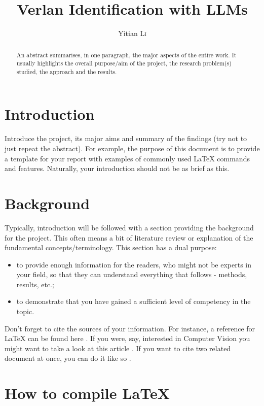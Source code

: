 \documentclass[12pt]{article}
\title{Verlan Identification with LLMs}
\author{Yitian \textsc{Li}}
\begin{document}
\maketitle

\begin{abstract}
An abstract summarises, in one paragraph, the major aspects of the entire work. It usually highlights the overall purpose/aim of the project, the research problem(s) studied, the approach and the results.
\end{abstract}

\section{Introduction}

Introduce the project, its major aims and summary of the findings (try not to just repeat the abstract). For example, the purpose of this document is to provide a template for your report with examples of commonly used \LaTeX{} commands and features. Naturally, your introduction should not be as brief as this.
 
\section{Background}

Typically, introduction will be followed with a section providing the background for the project. This often means a bit of literature review or explanation of the fundamental concepts/terminology. This section has a dual purpose: 
\begin{itemize}
\item to provide enough information for the readers, who might not be experts in your field, so that they can understand everything that follows - methods, results, etc.;
\item to demonstrate that you have gained a sufficient level of competency in the topic.
\end{itemize}

Don't forget to cite the sources of your information. For instance, a reference for \LaTeX{} can be found here \cite{latexcompanion}. If you were, say, interested in Computer Vision you might want to take a look at this article \cite{bettersift}. If you want to cite two related document at once, you can do it like so \cite{bettersift,sift}.

\section{How to compile \LaTeX{}}
\end{document}
